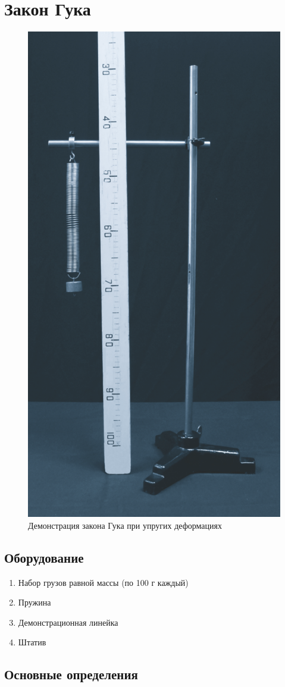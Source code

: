 \documentclass[All.tex]{subfiles}
\begin{document}

	\section{Закон Гука}


\begin{figure}[H] 
	\centering 
	\includegraphics[width=0.4\linewidth]{Hooke-1.png}
	\caption{Демонстрация закона Гука при упругих деформациях}
	\label{Hooke-1}
\end{figure}

\subsection*{\textcolor{PineGreen}{Оборудование}}

\begin{enumerate}
	\item Набор грузов равной массы (по 100 г каждый)
	\item Пружина
	\item Демонстрационная линейка
	\item Штатив
\end{enumerate}

\subsection*{\textcolor{PineGreen}{Основные определения}}
\end{document}

